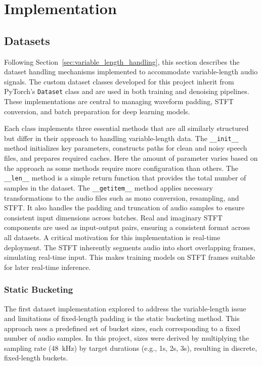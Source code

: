 \graphicspath{{content/chapters/6_implementation/figures/}}
\chapter{Implementation}
\label{chp:implementation}

\section{Datasets}
\label{sec:datasets}

Following Section~\ref{sec:variable_length_handling}, this section describes the dataset handling mechanisms implemented to accommodate variable-length audio signals. The custom dataset classes developed for this project inherit from PyTorch’s \texttt{Dataset} class and are used in both training and denoising pipelines. These implementations are central to managing waveform padding, STFT conversion, and batch preparation for deep learning models.

Each class implements three essential methods that are all similarly structured but differ in their approach to handling variable-length data. The \texttt{\_\_init\_\_} method initializes key parameters, constructs paths for clean and noisy speech files, and prepares required caches. Here the amount of parameter varies based on the approach as some methods require more configuration than others. The \texttt{\_\_len\_\_} method is a simple return function that provides the total number of samples in the dataset. The \texttt{\_\_getitem\_\_} method applies necessary transformations to the audio files such as mono conversion, resampling, and STFT. It also handles the padding and truncation of audio samples to ensure consistent input dimensions across batches. Real and imaginary STFT components are used as input-output pairs, ensuring a consistent format across all datasets. A critical motivation for this implementation is real-time deployment. The STFT inherently segments audio into short overlapping frames, simulating real-time input. This makes training models on STFT frames suitable for later real-time inference.

\subsection{Static Bucketing}
\label{subsec:static_dataset}

The first dataset implementation explored to address the variable-length issue and limitations of fixed-length padding is the static bucketing method. This approach uses a predefined set of bucket sizes, each corresponding to a fixed number of audio samples. In this project, sizes were derived by multiplying the sampling rate (48~kHz) by target durations (e.g., 1s, 2s, 3s), resulting in discrete, fixed-length buckets.

